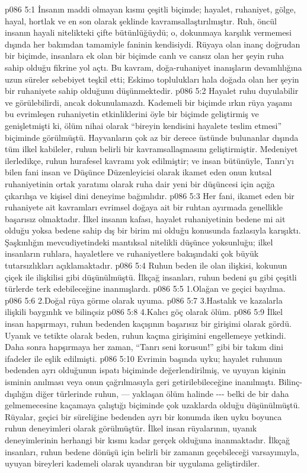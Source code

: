 \vs p086 5:1 İnsanın maddi olmayan kısmı çeşitli biçimde; hayalet, ruhaniyet, gölge, hayal, hortlak ve en son olarak  şeklinde kavramsallaştırılmıştır. Ruh, öncül insanın hayali nitelikteki çifte bütünlüğüydü; o, dokunmaya karşılık vermemesi dışında her bakımdan tamamiyle faninin kendisiydi. Rüyaya olan inanç doğrudan bir biçimde, insanlara ek olan bir biçimde canlı ve cansız olan her şeyin ruha sahip olduğu fikrine yol açtı. Bu kavram, doğa\hyp{}ruhaniyet inanışların devamlılığına uzun süreler sebebiyet teşkil etti; Eskimo toplulukları hala doğada olan her şeyin bir ruhaniyete sahip olduğunu düşünmektedir.
\vs p086 5:2 Hayalet ruhu duyulabilir ve görülebilirdi, ancak dokunulamazdı. Kademeli bir biçimde ırkın rüya yaşamı bu evrimleşen ruhaniyetin etkinliklerini öyle bir biçimde geliştirmiş ve genişletmişti ki, ölüm nihai olarak “bireyin kendisini hayalete teslim etmesi” biçiminde görülmüştü. Hayvanların çok az bir derece üstünde bulunanlar dışında tüm ilkel kabileler, ruhun belirli bir kavramsallaşmasını geliştirmiştir. Medeniyet ilerledikçe, ruhun hurafesel kavramı yok edilmiştir; ve insan bütünüyle, Tanrı’yı bilen fani insan ve Düşünce Düzenleyicisi olarak ikamet eden onun kutsal ruhaniyetinin ortak yaratımı olarak ruha dair yeni bir düşüncesi için açığa çıkarılışa ve kişisel dini deneyime bağımlıdır.
\vs p086 5:3 Her fani, ikamet eden bir ruhaniyete ait kavramları evrimsel doğaya ait bir ruhtan ayırmada genellikle başarısız olmaktadır. İlkel insanın kafası, hayalet ruhaniyetinin bedene mi ait olduğu yoksa bedene sahip dış bir birim mi olduğu konusunda fazlasıyla karışıktı. Şaşkınlığın mevcudiyetindeki mantıksal nitelikli düşünce yoksunluğu; ilkel insanların ruhlara, hayaletlere ve ruhaniyetlere bakışındaki çok büyük tutarsızlıkları açıklamaktadır.
\vs p086 5:4 Ruhun beden ile olan ilişkisi, kokunun çiçek ile ilişkilisi gibi düşünülmüştü. İlkçağ insanları, ruhun bedeni şu gibi çeşitli türlerde terk edebileceğine inanmışlardı.
\vs p086 5:5 1.\bibnobreakspace Olağan ve geçici bayılma.
\vs p086 5:6 2.\bibnobreakspace Doğal rüya görme olarak uyuma.
\vs p086 5:7 3.\bibnobreakspace Hastalık ve kazalarla ilişkili baygınlık ve bilinçsiz
\vs p086 5:8 4.\bibnobreakspace Kalıcı göç olarak ölüm.
\vs p086 5:9 İlkel insan hapşırmayı, ruhun bedenden kaçışının başarısız bir girişimi olarak gördü. Uyanık ve tetikte olarak beden, ruhun kaçma girişimini engellemeye yetkindi. Daha sonra hapşırmaya her zaman, “Tanrı seni korusun!” gibi bir takım dini ifadeler ile eşlik edilmişti.
\vs p086 5:10 Evrimin başında uyku; hayalet ruhunun bedenden ayrı olduğunun ispatı biçiminde değerlendirilmiş, ve uyuyan kişinin isminin anılması veya onun çağrılmasıyla geri getirilebileceğine inanılmıştı. Bilinç\hyp{}dışılığın diğer türlerinde ruhun, --- yaklaşan ölüm halinde \hyp{}\hyp{}\hyp{} belki de bir daha gelmemecesine kaçamaya çalıştığı biçiminde çok uzaklarda olduğu düşünülmüştü. Rüyalar, geçici bir süreliğine bedenden ayrı bir konumda iken uyku boyunca ruhun deneyimleri olarak görülmüştür. İlkel insan rüyalarının, uyanık deneyimlerinin herhangi bir kısmı kadar gerçek olduğuna inanmaktadır. İlkçağ insanları, ruhun bedene dönüşü için belirli bir zamanın geçebileceği varsayımıyla, uyuyan bireyleri kademeli olarak uyandıran bir uygulama geliştirdiler.
